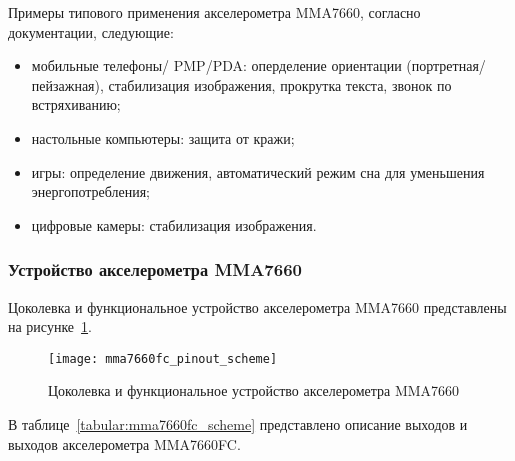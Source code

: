 \documentclass[document.tex]{subfiles}
\begin{document}
\noindent
Примеры типового применения акселерометра MMA7660, согласно документации, следующие:
\begin{itemize} 
	\item мобильные телефоны/ PMP/PDA: оперделение ориентации (портретная/пейзажная), стабилизация изображения, прокрутка текста, звонок по встряхиванию;
	\item настольные компьютеры: защита от кражи;
	\item игры: определение движения, автоматический режим сна для уменьшения энерго\-потребления;
	\item цифровые камеры: стабилизация изображения. \cite{accelerometer_mma7660}
\end{itemize}

\clearpage
\subsubsection{Устройство акселерометра MMA7660}
Цоколевка и функциональное устройство акселерометра MMA7660 представлены на ри\-сунке~\ref{fig:mma7660fc_pinout_scheme}.

\begin{figure}[here]
\centering
\texttt{[image: mma7660fc\_pinout\_scheme]}
\caption{Цоколевка и функциональное устройство акселерометра MMA7660}
\label{fig:mma7660fc_pinout_scheme}
\end{figure}

В таблице~\ref{tabular:mma7660fc_scheme} представлено описание выходов и выходов акселерометра MMA7660FC. 

\begin{table}[h]
\medskip
{}
\medskip
\caption{Общие характеристики цифровых акселерометров}
\label{tabular:mma7660fc_scheme}
\end{table}
\end{document}
